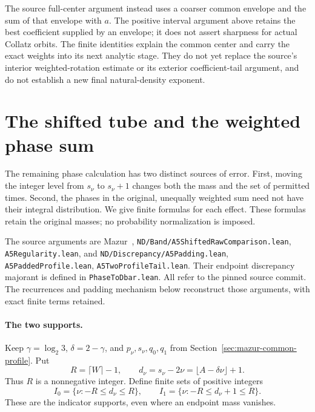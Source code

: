 \documentclass[11pt]{article}
\theoremstyle{remark}\newtheorem{remark}[proposition]{Remark}
\begin{document}
The source full-center argument instead uses a coarser common
envelope and the sum of that envelope with $a$. The positive
interval argument above retains the best coefficient supplied by
an envelope; it does not assert sharpness for actual Collatz orbits.
The finite identities explain the common center and carry the exact
weights into its next analytic stage. They do not yet replace the
source's interior weighted-rotation estimate or its exterior
coefficient-tail argument, and do not establish a new final
natural-density exponent.

\section{The shifted tube and the weighted phase sum}
\label{sec:mazur-weighted-phase}

The remaining phase calculation has two distinct sources of error.
First, moving the integer level from $s_\nu$ to $s_\nu+1$ changes
both the mass and the set of permitted times. Second, the phases in
the original, unequally weighted sum need not have their integral
distribution. We give finite formulas for each effect. These formulas
retain the original masses; no probability normalization is imposed.

The source arguments are Mazur~\cite{Mazur2026v2},
\texttt{ND/Band/A5ShiftedRawComparison.lean},
\texttt{A5Regularity.lean}, and
\texttt{ND/Discrepancy/A5Padding.lean},
\texttt{A5PaddedProfile.lean}, \texttt{A5TwoProfileTail.lean}.
Their endpoint discrepancy majorant is defined in
\texttt{PhaseToDbar.lean}. All refer to the pinned source commit.
The recurrences and padding mechanism below reconstruct those
arguments, with exact finite terms retained.

\paragraph{The two supports.}
Keep $\gamma=\log_2 3$, $\delta=2-\gamma$, and $p_\nu,s_\nu,q_0,q_1$
from Section~\ref{sec:mazur-common-profile}. Put
\[
 R=\lceil W\rceil-1,\qquad
 d_\nu=s_\nu-2\nu=\lfloor A-\delta\nu\rfloor+1 .
\]
Thus $R$ is a nonnegative integer. Define finite sets of positive integers
\[
 I_0=\{\nu:-R\le d_\nu\le R\},\qquad
 I_1=\{\nu:-R\le d_\nu+1\le R\}.
\]
These are the indicator supports, even where an endpoint mass vanishes.
\end{document}
